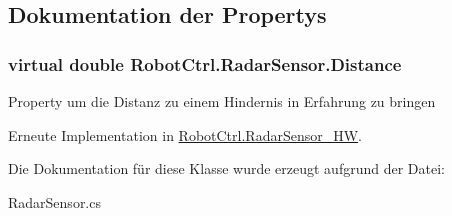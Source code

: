 \subsection{Dokumentation der Propertys}
\hypertarget{class_robot_ctrl_1_1_radar_sensor_a1be5541f3153ba40736f7a9fa292375b}{
\subsubsection[{Distance}]{\setlength{\rightskip}{0pt plus 5cm}virtual double RobotCtrl.RadarSensor.Distance}}
\label{class_robot_ctrl_1_1_radar_sensor_a1be5541f3153ba40736f7a9fa292375b}
Property um die Distanz zu einem Hindernis in Erfahrung zu bringen 

Erneute Implementation in \hyperlink{class_robot_ctrl_1_1_radar_sensor___h_w_a0eb1060a6e45bb29fdbf99e35481311e}{RobotCtrl.RadarSensor\_\-HW}.



Die Dokumentation für diese Klasse wurde erzeugt aufgrund der Datei:\begin{DoxyCompactItemize}
\item 
RadarSensor.cs\end{DoxyCompactItemize}
